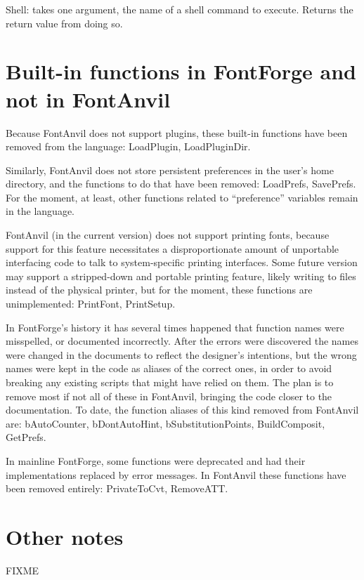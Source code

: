 
Shell:  takes one argument, the name of a shell command to execute.  Returns
the return value from doing so.

\section{Built-in functions in FontForge and not in FontAnvil}

Because FontAnvil does not support plugins, these built-in functions have
been removed from the language:  LoadPlugin, LoadPluginDir.

Similarly, FontAnvil does not store persistent preferences in the user's
home directory, and the functions to do that have been removed: LoadPrefs,
SavePrefs.  For the moment, at least, other functions related to
``preference'' variables remain in the language.

FontAnvil (in the current version) does not support printing fonts, because
support for this feature necessitates a disproportionate amount of
unportable interfacing code to talk to system-specific printing interfaces. 
Some future version may support a stripped-down and portable printing
feature, likely writing to files instead of the physical printer, but for
the moment, these functions are unimplemented:  PrintFont, PrintSetup.

In FontForge's history it has several times happened that function names
were misspelled, or documented incorrectly.  After the errors were
discovered the names were changed in the documents to reflect the designer's
intentions, but the wrong names were kept in the code as aliases of the
correct ones, in order to avoid breaking any existing scripts that might
have relied on them.  The plan is to remove most if not all of these in
FontAnvil, bringing the code closer to the documentation.  To date, the
function aliases of this kind removed from FontAnvil are: bAutoCounter,
bDontAutoHint, bSubstitutionPoints, BuildComposit, GetPrefs.

In mainline FontForge, some functions were deprecated and had their
implementations replaced by error messages.  In FontAnvil these functions
have been removed entirely:  PrivateToCvt, RemoveATT.

\section{Other notes}

FIXME

